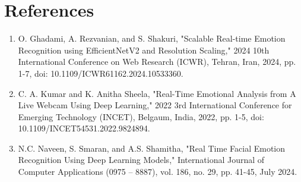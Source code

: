 \documentclass{article}
\begin{document}
\section*{References}
\begin{enumerate}
    \item O. Ghadami, A. Rezvanian, and S. Shakuri, "Scalable Real-time Emotion Recognition using EfficientNetV2 and Resolution Scaling," 2024 10th International Conference on Web Research (ICWR), Tehran, Iran, 2024, pp. 1-7, doi: 10.1109/ICWR61162.2024.10533360.
    \item C. A. Kumar and K. Anitha Sheela, "Real-Time Emotional Analysis from A Live Webcam Using Deep Learning," 2022 3rd International Conference for Emerging Technology (INCET), Belgaum, India, 2022, pp. 1-5, doi: 10.1109/INCET54531.2022.9824894.
    \item N.C. Naveen, S. Smaran, and A.S. Shamitha, "Real Time Facial Emotion Recognition Using Deep Learning Models," International Journal of Computer Applications (0975 – 8887), vol. 186, no. 29, pp. 41-45, July 2024.

\end{enumerate}
\end{document}
